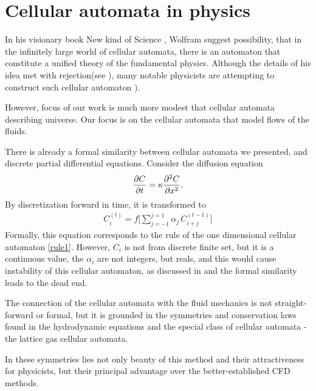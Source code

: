 



\section{Cellular automata in physics}
In his visionary book New kind of Science \cite{wolf}, Wolfram suggest possibility, that in the infinitely large world of cellular automata, there is an automaton that constitute a unified theory of the fundamental physics.
Although the details of his idea met with rejection(see \cite{aaronson}),
many notable physicists are attempting to construct such cellular automaton \cite{hooft}).
%

However, focus of our work is much more modest that cellular automata describing universe.
Our focus is on the cellular automata that model flows of the fluids.

There is already a formal similarity between cellular automata we presented, and discrete partial differential equations. Consider the diffusion equation
\begin{align*}
\frac{\partial C}{\partial t} = \kappa \frac{\partial^2 C}{\partial x^2}.
\end{align*}
By discretization forward in time, it is transformed to
\begin{align*}
C_i^{(t)} = f\big[\sum_{j=-1}^{j=1}\alpha_j \, C_{i+j}^{(t-1)} \big]
\end{align*}
Formally, this equation corresponds to the rule of the one dimensional cellular automaton \ref{rule1}. However, $C_i$ is not from discrete finite set, but it is a continuous value, the $\alpha_i$ are not integers, but reals, and this would cause instability of this cellular automaton, as discussed in \cite{wolf} and the formal similarity leads to the dead end.

The connection of the cellular automata with the fluid mechanics is not straight-forward or formal, but it is grounded in the symmetries and conservation laws found in the hydrodynamic equations and the special class of cellular automata - the lattice gas cellular automata.

In these symmetries lies not only beauty of this method and their attractiveness for physicists, but their principal advantage over the better-established CFD methods.
